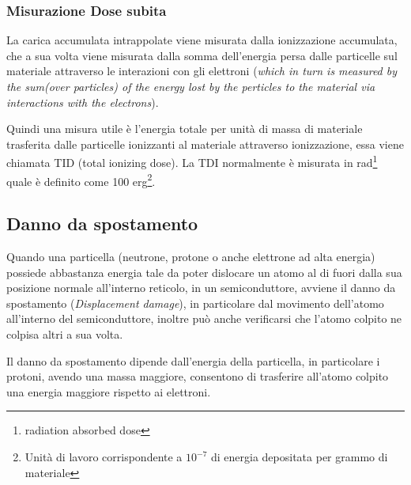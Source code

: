 \subsubsection*{Misurazione Dose subita}
La carica accumulata intrappolate viene misurata dalla ionizzazione accumulata, che a sua volta viene misurata dalla somma dell'energia persa dalle particelle sul materiale attraverso le interazioni con gli elettroni (\textit{which in turn is measured by the sum(over particles) of the energy lost by the perticles to the material via interactions with the electrons}).

Quindi una misura utile è l'energia totale per unità di massa di materiale trasferita dalle particelle ionizzanti al materiale attraverso ionizzazione, essa viene chiamata TID (total ionizing dose).
La TDI normalmente è misurata in rad\footnote{radiation absorbed dose} quale è definito come 100 erg\footnote{Unità di lavoro corrispondente a $10^{-7}$ di energia depositata per grammo di materiale}.


\subsection{Danno da spostamento}
Quando una particella (neutrone, protone o anche elettrone ad alta energia) possiede abbastanza energia tale da poter dislocare un atomo al di fuori dalla sua posizione normale all'interno reticolo, in un semiconduttore, avviene il danno da spostamento (\textit{Displacement damage}), in particolare dal movimento dell'atomo all'interno del semiconduttore, inoltre può anche verificarsi che l'atomo colpito ne colpisa altri a sua volta\cite{bib:Effetti_Radiazioni_1987}.

Il danno da spostamento dipende dall'energia della particella, in particolare i protoni, avendo una massa maggiore, consentono di trasferire all'atomo colpito una energia maggiore rispetto ai elettroni\cite{bib:Effetti_Radiazioni_su_dispositivi_optoeltronici}.